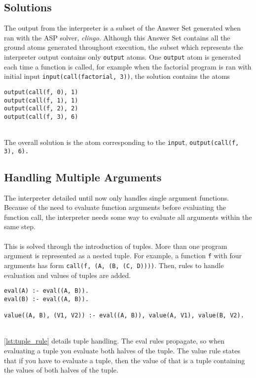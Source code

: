 \subsection{Solutions}
The output from the interpreter is a subset of the Answer Set generated when ran with the ASP solver, \textit{clingo}. Although this Answer Set contains all the ground atoms generated throughout execution, the subset which represents the interpreter output contains only \lstinline!output! atoms. One \lstinline!output! atom is generated each time a function is called, for example when the factorial program is ran with initial input \lstinline!input(call(factorial, 3))!, the solution contains the atoms \\

\begin{lstlisting}
output(call(f, 0), 1)
output(call(f, 1), 1) 
output(call(f, 2), 2) 
output(call(f, 3), 6)
\end{lstlisting}
\mbox{}\\
The overall solution is the atom corresponding to the \lstinline!input!, \lstinline!output(call(f, 3), 6).!

\subsection{Handling Multiple Arguments}
The interpreter detailed until now only handles single argument functions. Because of the need to evaluate function arguments before evaluating the function call, the interpreter needs some way to evaluate all arguments within the same step. \\ \\
This is solved through the introduction of tuples. More than one program argument is represented as a nested tuple. For example, a function \lstinline!f! with four arguments has form \lstinline!call(f, (A, (B, (C, D))))!. Then, rules to handle evaluation and values of tuples are added. 

\begin{lstlisting}[caption={Tuple rules}, label={lst:tuple_rule}, firstnumber=78]
eval(A) :- eval((A, B)).
eval(B) :- eval((A, B)).

value((A, B), (V1, V2)) :- eval((A, B)), value(A, V1), value(B, V2).
\end{lstlisting}
\mbox{}\\
\ref{lst:tuple_rule} details tuple handling. The eval rules propagate, so when evaluating a tuple you evaluate both halves of the tuple. The value rule states that if you have to evaluate a tuple, then the value of that is a tuple containing the values of both halves of the tuple.

